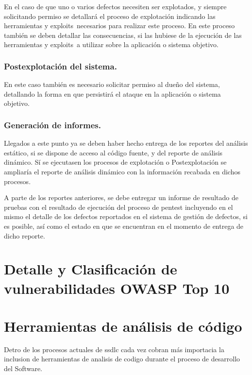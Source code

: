En el caso de que uno o varios defectos necesiten ser explotados, y siempre solicitando permiso se detallará 
el proceso de explotación indicando las herramientas y \glspl{exploit} necesarios para realizar este proceso. 
En este proceso también se deben detallar las consecuencias, si las hubiese de la ejecución de las herramientas y 
exploits a utilizar sobre la aplicación o sistema objetivo.

\subsubsection{Postexplotación del sistema.}

En este caso también es necesario solicitar permiso al dueño del sistema, detallando 
la forma en que persistirá el ataque en la aplicación o sistema objetivo.

\subsubsection{Generación de informes.}

Llegados a este punto ya se deben haber hecho entrega de los reportes del análisis estático, si se dispone de acceso al código fuente, y del reporte de análisis dinámico. Sí se ejecutasen los procesos de explotación o Postexplotación se ampliaría el reporte de análisis dinámico con la información recabada en dichos procesos.

A parte de los reportes anteriores, se debe entregar un informe de resultado de 
pruebas con el resultado de ejecución del proceso de pentest incluyendo en 
el mismo el detalle de los defectos reportados en el sistema de gestión de 
defectos, si es posible, así como el estado en que se encuentran en el momento
de entrega de dicho reporte.

\newpage
\section{Detalle y Clasificación de vulnerabilidades OWASP Top 10}


\newpage
\section{Herramientas de análisis de código}

Detro de los procesos actuales de \gls{ssdlc} cada vez cobran más importacia la inclusion de herramientas de analisis de codigo durante el proceso de desarrollo del Software.

